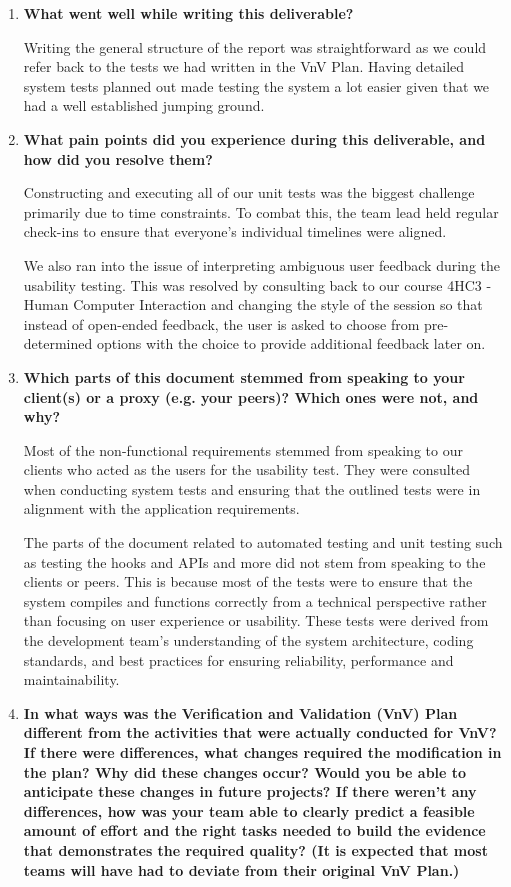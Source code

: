 \documentclass[12pt, titlepage]{article}
\begin{document}
\begin{enumerate}
  \item \textbf{What went well while writing this deliverable?}

  Writing the general structure of the report was straightforward as we could
  refer back to the tests we had written in the VnV Plan. Having detailed system tests 
  planned out made testing the system a lot easier given that we had a well established
  jumping ground.

  \item \textbf{What pain points did you experience during this deliverable, and
  how did you resolve them?}

  Constructing and executing all of our unit tests was the biggest challenge primarily due to
  time constraints. To combat this, the team lead held regular check-ins to ensure that everyone's
  individual timelines were aligned.

  We also ran into the issue of interpreting ambiguous user feedback during the usability testing. This 
  was resolved by consulting back to our course 4HC3 - Human Computer Interaction and changing the style of the 
  session so that instead of open-ended feedback, the user is asked to choose from pre-determined options with 
  the choice to provide additional feedback later on.

  \item \textbf{Which parts of this document stemmed from speaking to your
  client(s) or a proxy (e.g. your peers)? Which ones were not, and why?}

  Most of the non-functional requirements stemmed from speaking to our clients who acted as the users for 
  the usability test. They were consulted when conducting system tests and ensuring that the outlined tests were 
  in alignment with the application requirements. 

  The parts of the document related to automated testing and unit testing such as testing the hooks and APIs and more 
  did not stem from speaking to the clients or peers. This is because most of the tests were to ensure that the system 
  compiles and functions correctly from a technical perspective rather than focusing on user experience or usability. These 
  tests were derived from the development team's understanding of the system architecture, coding standards, and best practices 
  for ensuring reliability, performance and maintainability.

  \item \textbf{In what ways was the Verification and Validation (VnV) Plan
  different from the activities that were actually conducted for VnV?  If there
  were differences, what changes required the modification in the plan?  Why did
  these changes occur?  Would you be able to anticipate these changes in future
  projects?  If there weren't any differences, how was your team able to clearly
  predict a feasible amount of effort and the right tasks needed to build the
  evidence that demonstrates the required quality?  (It is expected that most
  teams will have had to deviate from their original VnV Plan.)}


\end{enumerate}
\end{document}
